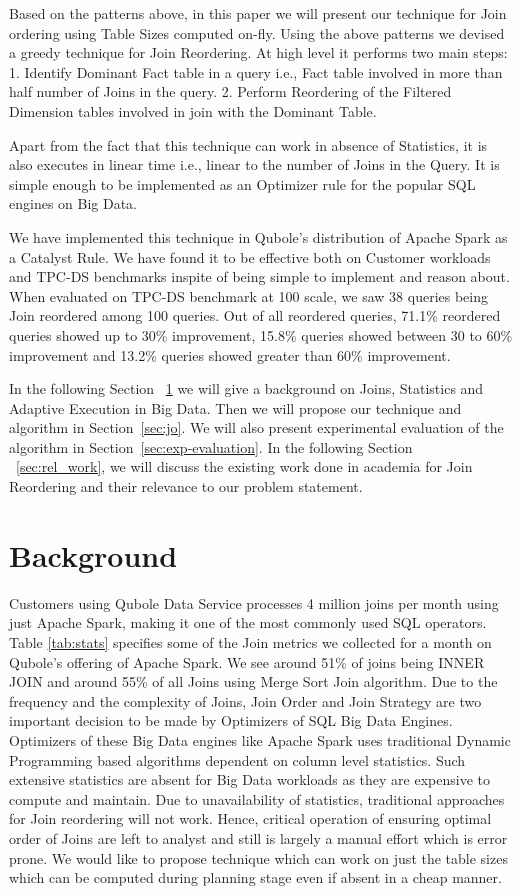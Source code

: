 \documentclass[conference]{IEEEtran}
\begin{document}
Based on the patterns above, in this paper we will present our technique for Join ordering using Table Sizes computed on-fly. Using the above patterns we devised a greedy technique for Join Reordering. At high level it performs two main steps:
1. Identify Dominant Fact table in a query i.e., Fact table involved in more than half number of Joins in the query. 
2. Perform Reordering of the Filtered Dimension tables involved in join with the Dominant Table.

Apart from the fact that this technique can work in absence of Statistics, it is also executes in linear time i.e., linear to the number of Joins in the Query. It is simple enough to be implemented as an Optimizer rule for the popular SQL engines on Big Data.  

We have implemented this technique in Qubole's distribution of Apache Spark as a Catalyst Rule. We have found it to be effective both on Customer workloads and TPC-DS benchmarks inspite of being simple to implement and reason about. When evaluated on TPC-DS benchmark at 100 scale, we saw 38 queries being Join reordered among 100 queries. Out of all reordered queries, 71.1\% reordered queries showed up to 30\% improvement, 15.8\% queries showed between 30 to 60\% improvement and 13.2\% queries showed greater than 60\% improvement.

In the following Section ~\ref{sec:background} we will give a background on Joins, Statistics and Adaptive Execution in Big Data. Then we will propose our technique and algorithm in Section~\ref{sec:jo}. We will also present experimental evaluation of the algorithm in Section~\ref{sec:exp-evaluation}. In the following Section ~\ref{sec:rel_work}, we will discuss the existing work done in academia for Join Reordering and their relevance to our problem statement.

\section{Background}\label{sec:background}

Customers using Qubole Data Service processes 4 million joins per month using just Apache Spark, making it one of the most commonly used SQL operators. Table \ref{tab:stats} specifies some of the Join metrics we collected for a month on Qubole's offering of Apache Spark. We see around 51\% of joins being INNER JOIN and around 55\% of all Joins using Merge Sort Join algorithm. Due to the frequency and the complexity of Joins, Join Order and Join Strategy are two important decision to be made by Optimizers of SQL Big Data Engines. Optimizers of these Big Data engines like Apache Spark uses traditional Dynamic Programming based algorithms \cite{b1} dependent on column level statistics. Such extensive statistics are absent for Big Data workloads as they are expensive to compute and maintain. Due to unavailability of statistics, traditional approaches for Join reordering will not work. Hence, critical operation of ensuring optimal order of Joins are left to analyst and still is largely a manual effort which is error prone. We would like to propose technique which can work on just the table sizes which can be computed during planning stage even if absent in a cheap manner.
\end{document}
